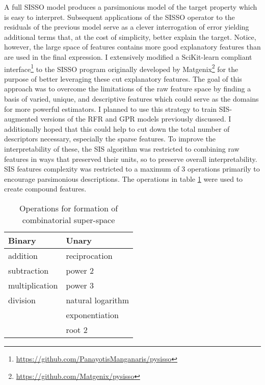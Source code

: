 A full SISSO model produces a parsimonious model of the target property which is easy to interpret.
Subsequent applications of the SISSO operator to the residuals of the previous model serve as a clever interrogation of error\autocite{mayo-1998-error-growt} yielding additional terms that, at the cost of simplicity, better explain the target.
Notice, however, the large space of features contains more good explanatory features than are used in the final expression.
I extensively modified a SciKit-learn compliant \autocite{buitinck-2013-api} interface\footnote{\url{https://github.com/PanayotisManganaris/pysisso}} to the SISSO program originally developed by Matgenix\footnote{\url{https://github.com/Matgenix/pysisso}} for the purpose of better leveraging these cut explanatory features.
The goal of this approach was to overcome the limitations of the raw feature space by finding a basis of varied, unique, and descriptive features which could serve as the domains for more powerful estimators.
I planned to use this strategy to train SIS-augmented versions of the RFR and GPR models previously discussed.
I additionally hoped that this could help to cut down the total number of descriptors necessary, especially the sparse features.
To improve the interpretability of these, the SIS algorithm was restricted to combining raw features in ways that preserved their units, so to preserve overall interpretability.
SIS features complexity was restricted to a maximum of 3 operations primarily to encourage parsimonious descriptions.
The operations in table \ref{tbl:ops} were used to create compound features.

\begin{table}[htbp]
\caption{\label{tbl:ops} Operations for formation of combinatorial super-space}
\centering
\begin{tabular}{ll}
Binary & Unary\\[0pt]
\hline
addition & reciprocation\\[0pt]
subtraction & power 2\\[0pt]
multiplication & power 3\\[0pt]
division & natural logarithm\\[0pt]
 & exponentiation\\[0pt]
 & root 2\\[0pt]
\end{tabular}
\end{table}

